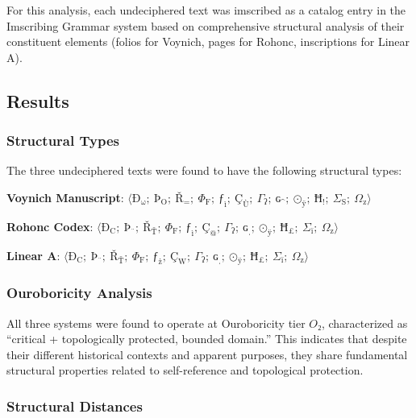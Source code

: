 \documentclass[12pt,a4paper]{article}
\begin{document}
For this analysis, each undeciphered text was imscribed as a catalog entry in the Imscribing Grammar system based on comprehensive structural analysis of their constituent elements (folios for Voynich, pages for Rohonc, inscriptions for Linear A).

\subsection{Results}

\subsubsection{Structural Types}

The three undeciphered texts were found to have the following structural types:

\textbf{Voynich Manuscript}: $\langle \text{Ð}_{\text{ω}};\ \text{Þ}_{\text{O}};\ \text{Ř}_{\text{=}};\ \Phi_{\text{F}};\ \text{ƒ}_{\text{ì}};\ \text{Ç}_{\text{Ù}};\ \Gamma_{\text{ʔ}};\ \text{ɢ}_{\text{\textasciicircum}};\ \text{⊙}_{\text{ÿ}};\ \text{Ħ}_{\text{!}};\ \Sigma_{\text{S}};\ \Omega_{\text{z}} \rangle$

\textbf{Rohonc Codex}: $\langle \text{Ð}_{\text{C}};\ \text{Þ}_{\text{¨}};\ \text{Ř}_{\text{Ť}};\ \Phi_{\text{F}};\ \text{ƒ}_{\text{ì}};\ \text{Ç}_{\text{@}};\ \Gamma_{\text{ʔ}};\ \text{ɢ}_{\text{ˌ}};\ \text{⊙}_{\text{ÿ}};\ \text{Ħ}_{\text{£}};\ \Sigma_{\text{ï}};\ \Omega_{\text{z}} \rangle$

\textbf{Linear A}: $\langle \text{Ð}_{\text{C}};\ \text{Þ}_{\text{¨}};\ \text{Ř}_{\text{Ť}};\ \Phi_{\text{F}};\ \text{ƒ}_{\text{ż}};\ \text{Ç}_{\text{W}};\ \Gamma_{\text{ʔ}};\ \text{ɢ}_{\text{ˌ}};\ \text{⊙}_{\text{ÿ}};\ \text{Ħ}_{\text{£}};\ \Sigma_{\text{ï}};\ \Omega_{\text{z}} \rangle$

\subsubsection{Ouroboricity Analysis}

All three systems were found to operate at Ouroboricity tier $O₂$, characterized as ``critical + topologically protected, bounded domain.'' This indicates that despite their different historical contexts and apparent purposes, they share fundamental structural properties related to self-reference and topological protection.

\subsubsection{Structural Distances}
\end{document}
